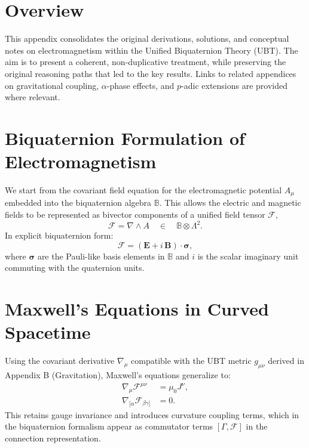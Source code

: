 
\section{Overview}
This appendix consolidates the original derivations, solutions, and conceptual notes on electromagnetism within the Unified Biquaternion Theory (UBT). The aim is to present a coherent, non-duplicative treatment, while preserving the original reasoning paths that led to the key results. Links to related appendices on gravitational coupling, $\alpha$-phase effects, and $p$-adic extensions are provided where relevant.

\section{Biquaternion Formulation of Electromagnetism}
We start from the covariant field equation for the electromagnetic potential $A_\mu$ embedded into the biquaternion algebra $\mathbb{B}$. This allows the electric and magnetic fields to be represented as bivector components of a unified field tensor $\mathcal{F}$,
\begin{equation}
    \mathcal{F} = \nabla \wedge A \quad \in \quad \mathbb{B} \otimes \Lambda^2.
\end{equation}
In explicit biquaternion form:
\begin{equation}
    \mathcal{F} = (\mathbf{E} + i\,\mathbf{B}) \cdot \boldsymbol{\sigma},
\end{equation}
where $\boldsymbol{\sigma}$ are the Pauli-like basis elements in $\mathbb{B}$ and $i$ is the scalar imaginary unit commuting with the quaternion units.

\section{Maxwell's Equations in Curved Spacetime}
Using the covariant derivative $\nabla_\mu$ compatible with the UBT metric $g_{\mu\nu}$ derived in Appendix B (Gravitation), Maxwell's equations generalize to:
\begin{align}
    \nabla_\mu \mathcal{F}^{\mu\nu} &= \mu_0 J^\nu, \\
    \nabla_{[\alpha} \mathcal{F}_{\beta\gamma]} &= 0.
\end{align}
This retains gauge invariance and introduces curvature coupling terms, which in the biquaternion formalism appear as commutator terms $[\Gamma, \mathcal{F}]$ in the connection representation.


